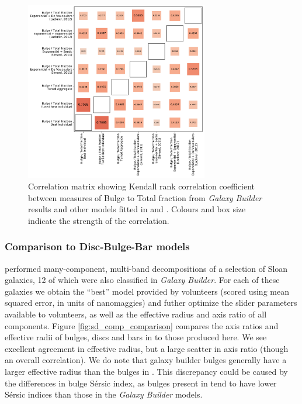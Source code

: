 \documentclass[../main.tex]{subfiles}
\begin{document}
\begin{figure}
  \includegraphics[width=8cm]{images__results/b-t_comparison_correlation.pdf}
  \caption{Correlation matrix showing Kendall rank correlation coefficient between measures of Bulge to Total fraction from \textit{Galaxy Builder} results and other models fitted in \citet{Simard2011:1107.1518v1} and \citet{2012MNRAS.421.2277L}. Colours and box size indicate the strength of the correlation.}
  \label{fig:bt_correlation}
\end{figure}


\subsubsection{Comparison to Disc-Bulge-Bar models}

\citet{Kruk2017:1710.00093v2} performed many-component, multi-band decompositions of a selection of Sloan galaxies, 12 of which were also classified in \textit{Galaxy Builder}. For each of these galaxies we obtain the ``best'' model provided by volunteers (scored using mean squared error, in units of nanomaggies) and futher optimize the slider parameters available to volunteers, as well as the effective radius and axis ratio of all components. Figure \ref{fig:sd_comp_comparison} compares the axis ratios and effective radii of bulges, discs and bars in \citet{Kruk2017:1710.00093v2} to those produced here. We see excellent agreement in effective radius, but a large scatter in axis ratio (though an overall correlation). We do note that galaxy builder bulges generally have a larger effective radius than the bulges in \citet{Kruk2017:1710.00093v2}. This discrepancy could be caused by the differences in bulge S\'ersic index, as bulges present in \citet{Kruk2017:1710.00093v2} tend to have lower S\'ersic indices than those in the \textit{Galaxy Builder} models.
\end{document}
